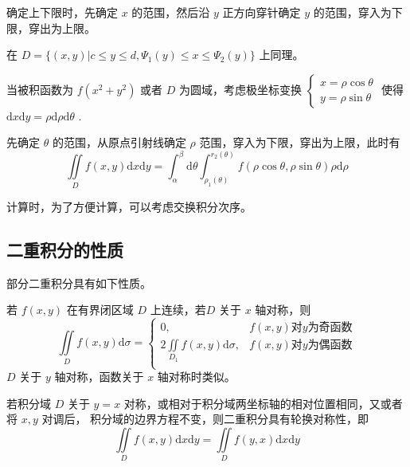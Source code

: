 确定上下限时，先确定 $ x $ 的范围，然后沿 $ y $ 正方向穿针确定 $ y $ 的范围，穿入为下限，穿出为上限。

在 $ D = \{(x,y)|c\leq y\leq d,\varPsi_1(y)\leq x\leq \varPsi_2(y)\} $ 上同理。


当被积函数为 $ f(x^2+y^2) $ 或者 $ D $ 为圆域，考虑极坐标变换 $ \begin{cases}
    x = \rho\cos\theta\\ y = \rho\sin\theta
\end{cases} $ 使得 $ \mathrm{d}x\mathrm{d}y = \rho\mathrm{d}\rho\mathrm{d}\theta $ .

先确定 $ \theta $ 的范围，从原点引射线确定 $ \rho $ 范围，穿入为下限，穿出为上限，此时有$$
    \iint\limits_{D}f(x,y)\mathrm{d}x\mathrm{d}y = \int_\alpha^\beta \mathrm{d}\theta
    \int_{\rho_1(\theta)}^{r_2(\theta)}f(\rho\cos\theta,\rho\sin\theta)\rho\mathrm{d}\rho
$$ 


计算时，为了方便计算，可以考虑交换积分次序。

\subsection{二重积分的性质}

部分二重积分具有如下性质。

\begin{Theo}[对称性]

    若 $ f(x,y) $ 在有界闭区域 $ D $ 上连续，若$ D $ 关于 $ x $ 轴对称，则$$
        \iint\limits_{D}f(x,y)\mathrm{d}\sigma = \begin{cases}
            0,& f(x,y)\textrm{对}y\textrm{为奇函数}\\
            2\iint\limits_{D_1}f(x,y)\mathrm{d}\sigma,& f(x,y)\textrm{对}y\textrm{为偶函数}\\
        \end{cases}
    $$ 
    $ D $ 关于 $ y $ 轴对称，函数关于 $ x $ 轴对称时类似。
\end{Theo}

\begin{Theo}[轮换对称性]

    若积分域 $ D $ 关于 $ y = x $ 对称，或相对于积分域两坐标轴的相对位置相同，又或者将 $ x,y $ 对调后，
    积分域的边界方程不变，则二重积分具有轮换对称性，即$$
        \iint\limits_{D}f(x,y)\mathrm{d}x\mathrm{d}y = \iint\limits_{D}f(y,x)\mathrm{d}x\mathrm{d}y
    $$ 
\end{Theo}

